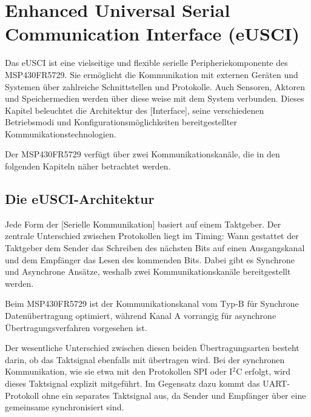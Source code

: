 \section{Enhanced Universal Serial Communication Interface (eUSCI)}
\label{sec:eUSCI}

Das eUSCI ist eine vielseitige und flexible serielle Peripheriekomponente des MSP430FR5729. Sie erm\"oglicht die Kommunikation mit externen Ger\"aten und Systemen \"uber zahlreiche Schnittstellen und Protokolle. Auch Sensoren, Aktoren und Speichermedien werden \"uber diese weise mit dem System verbunden. Dieses Kapitel beleuchtet die Architektur des [Interface], seine verschiedenen Betriebsmodi und Konfigurationsm\"oglichkeiten bereitgestellter Kommunikationstechnologien.

Der MSP430FR5729 verf\"ugt \"uber zwei Kommunikationskan\"ale, die in den folgenden Kapiteln n\"aher betrachtet werden. 

\newpage
\subsection{Die eUSCI-Architektur}
\label{sec:eUSCI_Architektur}

Jede Form der [Serielle Kommunikation] basiert auf einem Taktgeber. Der zentrale Unterschied zwischen Protokollen liegt im Timing: Wann gestattet der Taktgeber dem Sender das Schreiben des n\"achsten Bits auf einen Ausgangskanal und dem Empf\"anger das Lesen des kommenden Bits. Dabei gibt es Synchrone und Asynchrone Ans\"atze, weshalb zwei Kommunikationskan\"ale bereitgestellt werden. 

Beim MSP430FR5729 ist der Kommunikationskanal vom Typ-B f\"ur Synchrone Daten\"ubertragung optimiert, w\"ahrend Kanal A vorrangig f\"ur asynchrone \"Ubertragungsverfahren vorgesehen ist. 

Der wesentliche Unterschied zwischen diesen beiden \"Ubertragungsarten besteht darin, ob das Taktsignal ebenfalls mit \"ubertragen wird. Bei der synchronen Kommunikation, wie sie etwa mit den Protokollen SPI oder I$^{2}$C erfolgt, wird dieses Taktsignal explizit mitgef\"uhrt. Im Gegensatz dazu kommt das UART-Protokoll ohne ein separates Taktsignal aus, da Sender und Empf\"anger \"uber eine gemeinsame  synchronisiert sind. 

